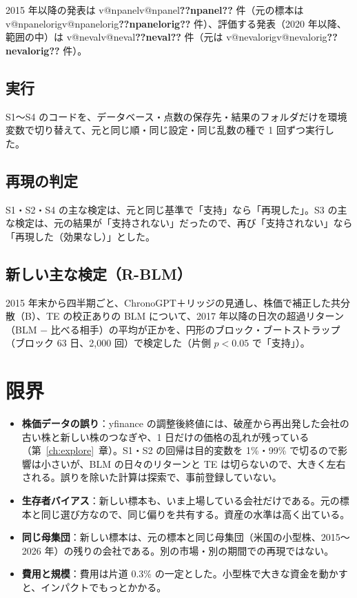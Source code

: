 \documentclass[xelatex,ja=standard,jafont=haranoaji,a4paper,10pt,openany]{bxjsreport}
\makeatletter
\newcommand{\V}[1]{\ifcsname v@#1\endcsname\csname v@#1\endcsname\else\textbf{??#1??}\fi}
\newcommand{\chapref}[1]{第~\ref{#1}~章}
\makeatother
\begin{document}
2015 年以降の発表は \V{npanel} 件（元の標本は \V{npanelorig} 件）、評価する発表（2020 年以降、範囲の中）は \V{neval} 件（元は \V{nevalorig} 件）。

\section{実行}

S1〜S4 のコードを、データベース・点数の保存先・結果のフォルダだけを環境変数で切り替えて、元と同じ順・同じ設定・同じ乱数の種で 1 回ずつ実行した。

\section{再現の判定}

S1・S2・S4 の主な検定は、元と同じ基準で「支持」なら「再現した」。S3 の主な検定は、元の結果が「支持されない」だったので、再び「支持されない」なら「再現した（効果なし）」とした。

\section{新しい主な検定（R-BLM）}

2015 年末から四半期ごと、ChronoGPT＋リッジの見通し、株価で補正した共分散（B）、TE の校正ありの BLM について、2017 年以降の日次の超過リターン（BLM − 比べる相手）の平均が正かを、円形のブロック・ブートストラップ（ブロック 63 日、2,000 回）で検定した（片側 $p < 0.05$ で「支持」）。



\chapter{限界}\label{ch:limits}

\begin{itemize}
\item \textbf{株価データの誤り}：yfinance の調整後終値には、破産から再出発した会社の古い株と新しい株のつなぎや、1 日だけの価格の乱れが残っている（\chapref{ch:explore}）。S1・S2 の回帰は目的変数を 1\%・99\% で切るので影響は小さいが、BLM の日々のリターンと TE は切らないので、大きく左右される。誤りを除いた計算は探索で、事前登録していない。
\item \textbf{生存者バイアス}：新しい標本も、いま上場している会社だけである。元の標本と同じ選び方なので、同じ偏りを共有する。資産の水準は高く出ている。
\item \textbf{同じ母集団}：新しい標本は、元の標本と同じ母集団（米国の小型株、2015〜2026 年）の残りの会社である。別の市場・別の期間での再現ではない。
\item \textbf{費用と規模}：費用は片道 0.3\% の一定とした。小型株で大きな資金を動かすと、インパクトでもっとかかる。
\end{itemize}
\end{document}
